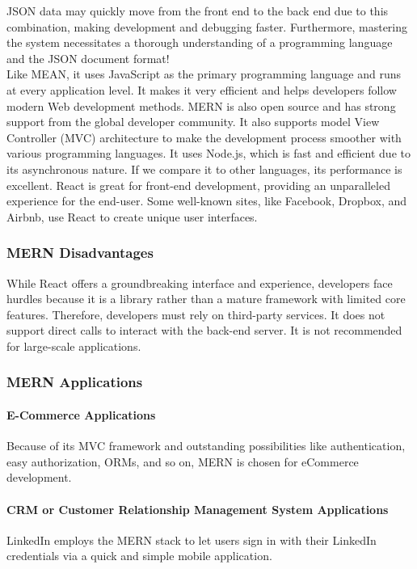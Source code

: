 \documentclass[a4paper, 11pt]{report}
\begin{document}
JSON data may quickly move from the front end to the back end due to this combination, making development and debugging faster. Furthermore, mastering the system necessitates a thorough understanding of a programming language and the JSON document format! \cite{(MongoDB, n.d.)}\\

Like MEAN, it uses JavaScript as the primary programming language and runs at every application level. It makes it very efficient and helps developers follow modern Web development methods. MERN is also open source and has strong support from the global developer community. It also supports model View Controller (MVC) architecture to make the development process smoother with various programming languages. It uses Node.js, which is fast and efficient due to its asynchronous nature. If we compare it to other languages, its performance is excellent. React is great for front-end development, providing an unparalleled experience for the end-user. Some well-known sites, like Facebook, Dropbox, and Airbnb, use React to create unique user interfaces.\\

\subsubsection{MERN Disadvantages}
While React offers a groundbreaking interface and experience, developers face hurdles because it is a library rather than a mature framework with limited core features. Therefore, developers must rely on third-party services. It does not support direct calls to interact with the back-end server. It is not recommended for large-scale applications.\cite{(Mathur, 2020)}

\subsubsection{MERN Applications}
\paragraph{E-Commerce Applications}
Because of its MVC framework and outstanding possibilities like authentication, easy authorization, ORMs, and so on, MERN is chosen for eCommerce development.\\
\paragraph{CRM or Customer Relationship Management System Applications}
LinkedIn employs the MERN stack to let users sign in with their LinkedIn credentials via a quick and simple mobile application.\\
\end{document}
